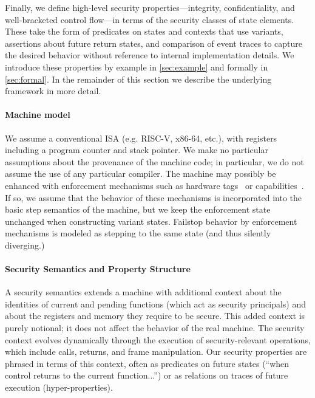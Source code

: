 \documentclass[10pt,conference]{ieeetran}%
\theoremstyle{definition}
\begin{document}
Finally, we define high-level security properties---integrity, confidentiality,
and well-bracketed control flow---in terms of the security classes of state
elements. These take the form of predicates on states and contexts
that use variants,
assertions about future return states, and comparison of event traces to capture the
desired behavior without reference to internal implementation details.
We introduce these properties by example in \cref{sec:example} and
formally in \cref{sec:formal}. In the remainder
of this section we describe the underlying framework in more detail.

\paragraph*{Machine model}
We assume a conventional ISA (e.g. RISC-V, x86-64, etc.), with registers including a program counter
and stack pointer. 
We make no particular assumptions about the provenance of the machine code; in particular,
we do not assume the use of any particular compiler.
The machine may possibly be enhanced with %
enforcement mechanisms such as hardware tags~\cite{pump_hasp2014,Gollapudi+23} or capabilities~\cite{Woodruff+14}. If so,
we assume that the behavior of these mechanisms is incorporated into the basic
step semantics of the machine, but we keep the enforcement state unchanged when constructing variant states.
Failstop behavior by enforcement mechanisms is modeled as stepping to the same state
(and thus silently diverging.)

\paragraph*{Security Semantics and Property Structure}
A security semantics extends a machine
with additional context about the identities of current and pending
functions (which act as security principals) and about the registers and memory they require
to be secure. This added context is purely notional;
it does not affect the behavior of the real machine. The security context
evolves dynamically through the execution of security-relevant operations,
which include calls, returns, and frame manipulation.
Our security properties are phrased in terms of this context, often as predicates
on future states (``when control returns to the current function...'')
or as relations on traces of future execution
(hyper-properties).
\end{document}
